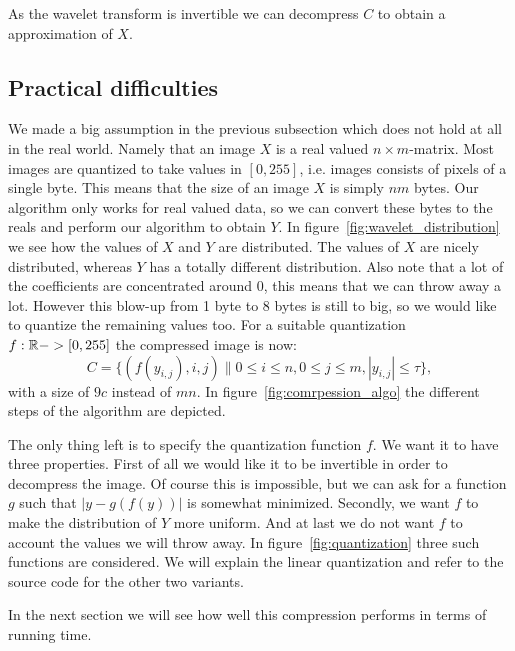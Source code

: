 As the wavelet transform is invertible we can decompress $C$ to obtain a approximation of $X$.


\subsection{Practical difficulties}
We made a big assumption in the previous subsection which does not hold at all in the real world. Namely that an image $X$ is a real valued $n \times m$-matrix. Most images are quantized to take values in $[0, 255]$, i.e. images consists of pixels of a single byte. This means that the size of an image $X$ is simply $nm$ bytes. Our algorithm only works for real valued data, so we can convert these bytes to the reals and perform our algorithm to obtain $Y$. In figure~\ref{fig:wavelet_distribution} we see how the values of $X$ and $Y$ are distributed. The values of $X$ are nicely distributed, whereas $Y$ has a totally different distribution. Also note that a lot of the coefficients are concentrated around $0$, this means that we can throw away a lot. However this blow-up from 1 byte to 8 bytes is still to big, so we would like to quantize the remaining values too. For a suitable quantization $f: \mathbb{R} -> [0, 255]$ the compressed image is now:
\[ C = \{ (f(y_{i,j}), i, j) \| 0 \leq i \leq n, 0 \leq j \leq m, |y_{i,j}| \leq \tau \}, \]
with a size of $9c$ instead of $mn$. In figure~\ref{fig:comrpession_algo} the different steps of the algorithm are depicted.


The only thing left is to specify the quantization function $f$. We want it to have three properties. First of all we would like it to be invertible in order to decompress the image. Of course this is impossible, but we can ask for a function $g$ such that $|y - g(f(y))|$ is somewhat minimized. Secondly, we want $f$ to make the distribution of $Y$ more uniform. And at last we do not want $f$ to account the values we will throw away. In figure~\ref{fig:quantization} three such functions are considered. We will explain the linear quantization and refer to the source code for the other two variants.



In the next section we will see how well this compression performs in terms of running time.
